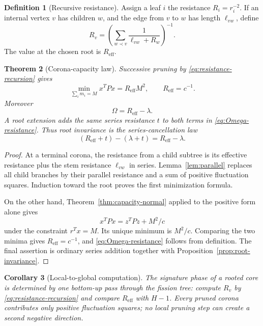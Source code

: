 \documentclass[11pt,a4paper]{amsart}
\theoremstyle{plain}
\newtheorem{theorem}{Theorem}[section]
\newtheorem{corollary}[theorem]{Corollary}
\theoremstyle{definition}
\newtheorem{definition}[theorem]{Definition}
\begin{document}
\begin{definition}[Recursive resistance]\label{def:recursive-R}
Assign a leaf $i$ the resistance $R_i=r_i^{-2}$.  If an internal vertex $v$ has children $w$, and
the edge from $v$ to $w$ has length $\ell_{vw}$, define
\begin{equation}\label{eq:resistance-recursion}
                  R_v=\left(\sum_{w\prec v}
                    \frac{1}{\ell_{vw}+R_w}\right)^{-1}.
\end{equation}
The value at the chosen root is $R_{\mathrm{eff}}$.
\end{definition}

\begin{theorem}[Corona-capacity law]\label{thm:corona-capacity}
Successive pruning by \eqref{eq:resistance-recursion} gives
\begin{equation}\label{eq:min-energy}
 \min_{\sum_i m_i=M}x^TPx=R_{\mathrm{eff}}M^2,
 \qquad R_{\mathrm{eff}}=c^{-1}.
\end{equation}
Moreover
\begin{equation}\label{eq:Omega-resistance}
                         \Omega=R_{\mathrm{eff}}-\lambda.
\end{equation}
A root extension adds the same series resistance $t$ to both terms in
\eqref{eq:Omega-resistance}.  Thus root invariance is the series-cancellation law
\[
 (R_{\mathrm{eff}}+t)-(\lambda+t)=R_{\mathrm{eff}}-\lambda.
\]
\end{theorem}

\begin{proof}
At a terminal corona, the resistance from a child subtree is its effective resistance plus the
stem resistance $\ell_{vw}$ in series.  Lemma~\ref{lem:parallel} replaces all child branches by
their parallel resistance and a sum of positive fluctuation squares.  Induction toward the root
proves the first minimization formula.

On the other hand, Theorem~\ref{thm:capacity-normal} applied to the positive form alone gives
\[
 x^TPx=z^TPz+M^2/c
\]
under the constraint $r^Tx=M$.  Its unique minimum is $M^2/c$.  Comparing the two minima gives
$R_{\mathrm{eff}}=c^{-1}$, and \eqref{eq:Omega-resistance} follows from definition.
The final assertion is ordinary series addition together with
Proposition~\ref{prop:root-invariance}.
\end{proof}

\begin{corollary}[Local-to-global computation]\label{cor:message-passing}
The signature phase of a rooted core is determined by one bottom-up pass through the fission tree:
compute $R_v$ by \eqref{eq:resistance-recursion} and compare $R_{\mathrm{eff}}$ with $H-1$.
Every pruned corona contributes only positive fluctuation squares; no local pruning step can create
a second negative direction.
\end{corollary}
\end{document}
